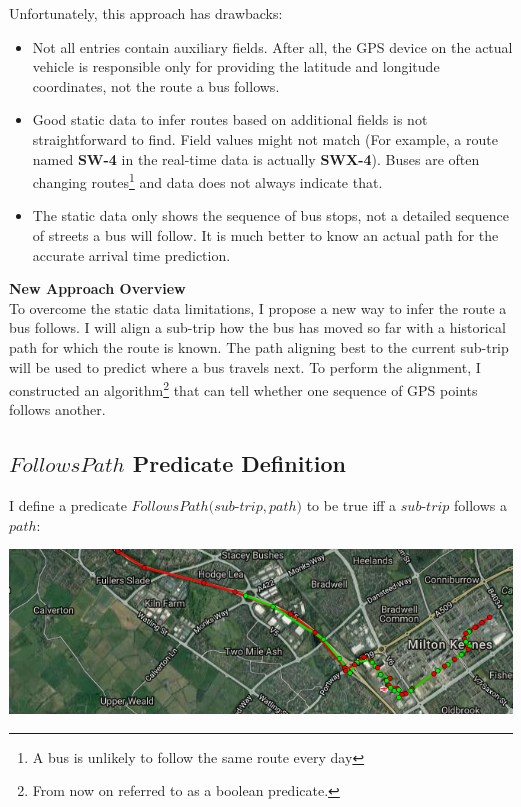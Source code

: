 \documentclass[12pt,a4paper,oneside,openright]{report}
\begin{document}
Unfortunately, this approach has drawbacks:

\begin{itemize}
\item Not all entries contain auxiliary fields. After all, the GPS device on the
actual vehicle is responsible only for providing the latitude and longitude
coordinates, not the route a bus follows.

\item Good static data to infer routes based on additional fields is not 
straightforward to find. Field values might not match
(For example, a route named \textbf{SW-4} in the real-time data is actually
\textbf{SWX-4}).
Buses are often changing routes\footnote{A bus is unlikely to follow the same route
every day} and data does not always indicate that.

\item The static data only shows the sequence of bus stops, not a detailed
sequence of streets a bus will follow. It is much better to know an actual
path for the accurate arrival time prediction.
\end{itemize}

\textbf{New Approach Overview} \\

To overcome the static data limitations, I propose a new way to infer the
route a bus follows. I will align a sub-trip how the bus has moved
so far with a historical path for which the route is known. The path aligning
best to the current sub-trip will be used to predict where a bus travels next.
To perform the alignment, I constructed an algorithm\footnote{From now on referred
to as a boolean predicate.} that can tell whether one sequence of GPS points 
follows another.

\subsection{$FollowsPath$ Predicate Definition}

I define a predicate $FollowsPath(sub$-$trip, path)$ to be true iff a $sub$-$trip$
follows a $path$:

\includegraphics[width=\textwidth]{figs/follows.png}
\end{document}
